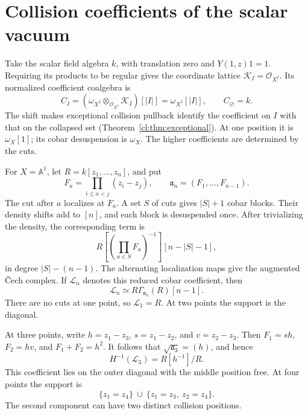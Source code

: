 \section{Collision coefficients of the scalar vacuum}

Take\label{e1f:def:scalar-vacuum-field} the scalar field algebra \(k\), with translation zero
and \(Y(1,z)1=1\). Requiring its products to be regular
gives the coordinate lattice \(\mathcal K_I=\mathcal O_{X^I}\).
Its normalized coefficient coalgebra is
\begin{equation}\label{e1f:eq:scalar-coalgebra}
 C_I=(\omega_{X^I}\otimes_{\mathcal O_{X^I}}\mathcal K_I)[|I|]
                  =\omega_{X^I}[|I|],
 \qquad C_\varnothing=k.
\end{equation}
The shift makes exceptional collision pullback identify the
coefficient on \(I\) with that on the collapsed set
(Theorem~\ref{cl:thm:exceptional}). At one position it is
\(\omega_X[1]\); its cobar desuspension is \(\omega_X\).
The higher coefficients are determined by the cuts.

For\label{e1f:def:scalar-cut-ideal} \(X=\mathbb A^1\), let \(R=k[z_1,\ldots,z_n]\), and
put
\[
 F_a=\prod_{i\leq a<j}(z_i-z_j),
 \qquad \mathfrak a_n=(F_1,\ldots,F_{n-1}).
\]
The cut after \(a\) localizes at \(F_a\). A set \(S\)
of cuts gives \(|S|+1\) cobar blocks. Their density shifts
add to \([n]\), and each block is desuspended once.
After trivializing the density, the corresponding term is
\begin{equation}\label{e1f:eq:scalar-cobar-term}
 R\left[(\prod_{a\in S}F_a)^{-1}\right][n-|S|-1],
\end{equation}
in\label{e1f:def:scalar-cobar-coefficient} degree \(|S|-(n-1)\). The alternating localization maps
give the augmented \v{C}ech complex. If \(\mathcal L_n\)
denotes this reduced cobar coefficient, then
\[
 \mathcal L_n\simeq R\Gamma_{\mathfrak a_n}(R)[n-1].
\]
There are no cuts at one point, so \(\mathcal L_1=R\).
At two points the support is the diagonal.

At three points, write \(h=z_1-z_3\), \(s=z_1-z_2\),
and \(v=z_2-z_3\). Then \(F_1=sh\), \(F_2=hv\), and
\(F_1+F_2=h^2\). It follows that
\(\sqrt{\mathfrak a_3}=(h)\), and hence
\[
 H^{-1}(\mathcal L_3)=R[h^{-1}]/R.
\]
This coefficient lies on the outer diagonal with the middle
position free. At four points the support is
\[
 \{z_1=z_4\}\ \cup\ \{z_1=z_3,\ z_2=z_4\}.
\]
The second component can have two distinct collision positions.


